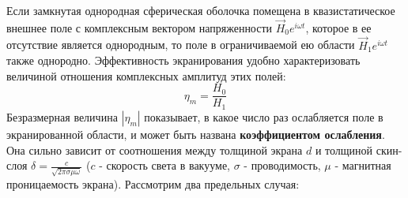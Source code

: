 Если замкнутая однородная сферическая оболочка помещена в квазистатическое внешнее поле с комплексным вектором напряженности $\vec{H}_{0} e^{i \omega t}$, которое в ее отсутствие является однородным, то поле в ограничиваемой ею области $\vec{H}_{1} e^{i \omega t}$ также однородно. Эффективность экранирования удобно характеризовать величиной отношения комплексных амплитуд этих полей:
\begin{equation} 
	\eta_{m}=\frac{H_0}{H_1}
	\label{eq:1}
\end{equation}
Безразмерная величина $|\eta_{m}|$ показывает, в какое число раз ослабляется поле в экранированной области, и может быть названа \textbf{коэффициентом ослабления}. Она сильно зависит от соотношения между толщиной экрана $d$ и толщиной скин-слоя $\delta=\frac{c}{\sqrt{2\pi\sigma\mu\omega}}$ ($c$ - скорость света в вакууме, $\sigma$ - проводимость, $\mu$ - магнитная проницаемость экрана). Рассмотрим два предельных случая:



